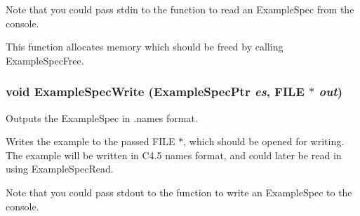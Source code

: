 Note that you could pass stdin to the function to read an Example\-Spec from the console.

This function allocates memory which should be freed by calling Example\-Spec\-Free. 
\subsubsection{\setlength{\rightskip}{0pt plus 5cm}void Example\-Spec\-Write ({\bf Example\-Spec\-Ptr} {\em es}, FILE $\ast$ {\em out})}\label{ExampleSpec_8h_a44}


Outputs the Example\-Spec in .names format. 

Writes the example to the passed FILE $\ast$, which should be opened for writing. The example will be written in C4.5 names format, and could later be read in using Example\-Spec\-Read.

Note that you could pass stdout to the function to write an Example\-Spec to the console. 
